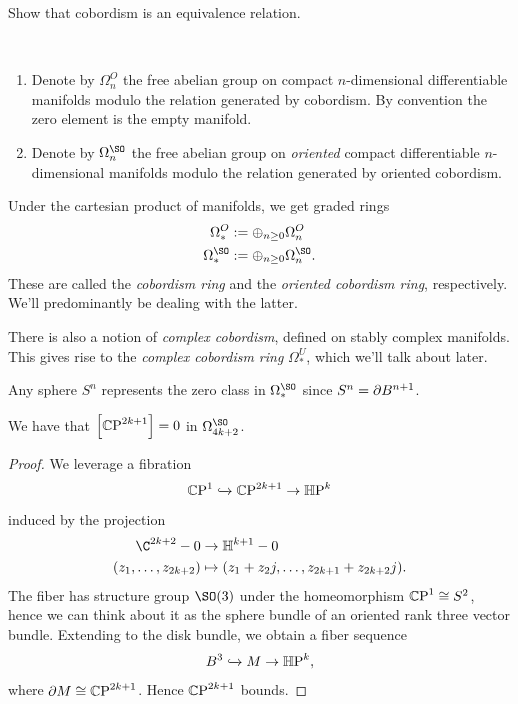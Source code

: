 \documentclass[11pt]{book}
\begin{document}
\begin{exercise} Show that cobordism is an equivalence relation.
\end{exercise}

\begin{definition}\label{def:cobordism-ring} \,
\begin{enumerate}
    \item Denote by $\Omega^O_n$ the free abelian group on compact $n$-dimensional differentiable manifolds modulo the relation generated by cobordism. By convention the zero element is the empty manifold.
    \item Denote by $\Omega^{\SO}_n$ the free abelian group on \emph{oriented} compact differentiable $n$-dimensional manifolds modulo the relation generated by oriented cobordism.
\end{enumerate}
\end{definition}

\begin{proposition} Under the cartesian product of manifolds, we get graded rings
\begin{align*}
    \Omega^O_\ast &:= \oplus_{n\ge0} \Omega^O_n \\
    \Omega^\SO_\ast &:= \oplus_{n\ge0} \Omega^\SO_n.
\end{align*}
These are called the \emph{cobordism ring} and the \emph{oriented cobordism ring}, respectively. We'll predominantly be dealing with the latter.
\end{proposition}


\begin{remark} There is also a notion of \emph{complex cobordism}, defined on stably complex manifolds. This gives rise to the \emph{complex cobordism ring} $\Omega^U_\ast$, which we'll talk about later.
\end{remark}

\begin{example} Any sphere $S^n$ represents the zero class in $\Omega^\SO_\ast$ since $S^n = \partial B^{n+1}$.
\end{example}

\begin{proposition} We have that $\left[ {\mathbb{C}\text{P}}^{2k+1} \right]=0$ in $\Omega^{\SO}_{4k+2}$.
\end{proposition}
\begin{proof} We leverage a fibration
\begin{align*}
    {\mathbb{C}\text{P}}^1 \xhookrightarrow{} {\mathbb{C}\text{P}}^{2k+1} \to {\mathbb{H}\text{P}}^k
\end{align*}
induced by the projection
\begin{align*}
    \C^{2k+2}-0 &\to \mathbb{H}^{k+1}-0 \\
    (z_1, \ldots, z_{2k+2}) &\mapsto (z_1 + z_2j, \ldots, z_{2k+1}+z_{2k+2}j).
\end{align*}
The fiber has structure group $\SO(3)$ under the homeomorphism ${\mathbb{C}\text{P}}^1 \cong S^2$, hence we can think about it as the sphere bundle of an oriented rank three vector bundle. Extending to the disk bundle, we obtain a fiber sequence
\begin{align*}
    B^3 \xhookrightarrow{} M \to {\mathbb{H}\text{P}}^k,
\end{align*}
where $\partial M \cong {\mathbb{C}\text{P}}^{2k+1}$. Hence ${\mathbb{C}\text{P}}^{2k+1}$ bounds.
\end{proof}
\end{document}
